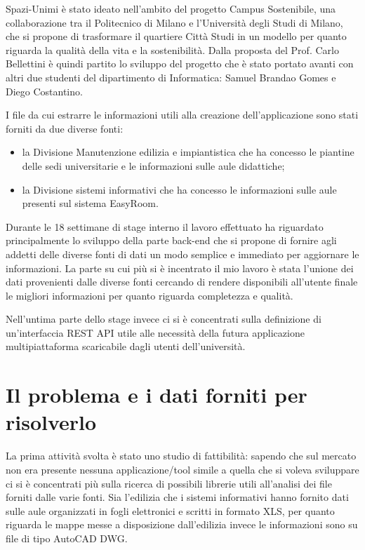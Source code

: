 \documentclass[12pt]{report}
\begin{document}
Spazi-Unimi è stato ideato nell’ambito del progetto Campus Sostenibile, una collaborazione tra il Politecnico di Milano e l’Università degli Studi di Milano, che si propone di trasformare il quartiere Città Studi in un modello per quanto riguarda la qualità della vita e la sostenibilità.
Dalla proposta del Prof. Carlo Bellettini è quindi partito lo sviluppo del progetto che è stato portato avanti con altri due studenti del dipartimento di Informatica: Samuel Brandao Gomes e Diego Costantino.

I file da cui estrarre le informazioni utili alla creazione dell’applicazione sono stati forniti da due diverse fonti:
\begin{itemize}
\item la Divisione Manutenzione edilizia e impiantistica che ha concesso le piantine delle sedi universitarie e le informazioni sulle aule didattiche;
\item la Divisione sistemi informativi che ha concesso le informazioni sulle aule presenti sul sistema EasyRoom.
\end{itemize}

Durante le 18 settimane di stage interno il lavoro effettuato ha riguardato principalmente lo sviluppo della parte back-end che si propone di fornire agli addetti delle diverse fonti di dati un modo semplice e immediato per aggiornare le informazioni.
La parte su cui più si è incentrato il mio lavoro è stata l'unione dei dati provenienti dalle diverse fonti cercando di rendere disponibili all'utente finale le migliori informazioni per quanto riguarda completezza e qualità.

Nell'untima parte dello stage invece ci si è concentrati sulla definizione di un'interfaccia REST API utile alle necessità della futura applicazione multipiattaforma scaricabile dagli utenti dell'università.


\section{Il problema e i dati forniti per risolverlo}

La prima attività svolta è stato uno studio di fattibilità: sapendo che sul mercato non era presente nessuna applicazione/tool simile a quella che si voleva sviluppare ci si è concentrati più sulla ricerca di possibili librerie utili all'analisi dei file forniti dalle varie fonti. 
Sia l'edilizia che i sistemi informativi hanno fornito dati sulle aule organizzati in fogli elettronici e scritti in formato XLS, per quanto riguarda le mappe messe a disposizione dall'edilizia invece le informazioni sono su file di tipo AutoCAD DWG. 
\end{document}
